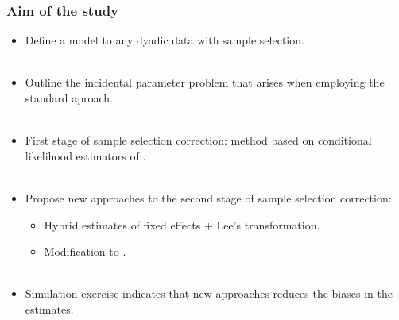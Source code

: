   \begin{frame}
      \frametitle{Aim of the study}
      \begin{itemize}
          \item<1->  Define a model to any dyadic data with sample selection. \\~\\ 
          \item<2->  Outline the incidental parameter problem that arises when employing the standard \cite{heckman1979sample} aproach. \\~\\ 
          \item<3->  First stage of sample selection correction: method based on conditional likelihood estimators of \cite{charbonneau2017multiple}. \\~\\ 
          \item<4->  Propose new approaches to the second stage of sample selection correction: 
          \begin{itemize}
              \item Hybrid estimates of fixed effects + Lee's transformation.
              \item Modification to \cite{kyriazidou1997estimation}. \\~\\ 
          \end{itemize}
          \item<5-> Simulation exercise indicates that new approaches reduces the biases in the estimates. 
      \end{itemize}
  \end{frame}